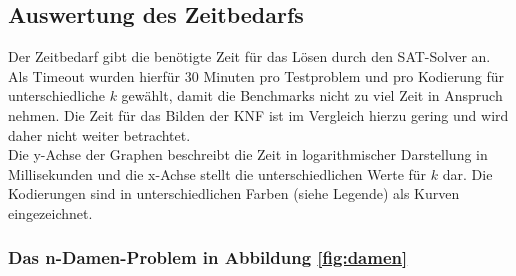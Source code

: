 \documentclass[a4,abstract=on]{scrartcl}
\begin{document}
\subsection{Auswertung des Zeitbedarfs}

Der Zeitbedarf gibt die benötigte Zeit für das Lösen durch den SAT-Solver an. Als Timeout wurden hierfür 30 Minuten pro Testproblem und pro Kodierung für unterschiedliche $k$ gewählt, damit die Benchmarks nicht zu viel Zeit in Anspruch nehmen. Die Zeit für das Bilden der KNF ist im Vergleich hierzu gering und wird daher nicht weiter betrachtet.\\
Die y-Achse der Graphen beschreibt die Zeit in logarithmischer Darstellung in Millisekunden und die x-Achse stellt die unterschiedlichen Werte für $k$ dar. Die Kodierungen sind in unterschiedlichen Farben (siehe Legende) als Kurven eingezeichnet.

\subsubsection*{Das n-Damen-Problem in Abbildung \ref{fig:damen}}

\end{document}
